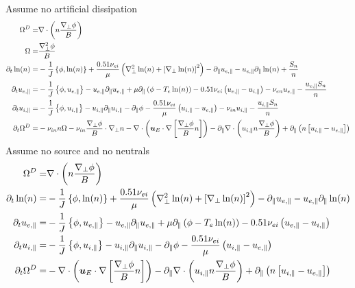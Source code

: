 Assume no artificial dissipation
\begin{align*}
\Om^D =& \div\L(n\frac{\grad_\perp\phi}{B}\R)
\\
%
%
%
\Om =& \frac{\grad_\perp^2\phi }{B}
\\
%
%
%
\partial_t \ln(n)
=&
 -\frac{1}{J}\L\{\phi,\ln(n)\R\}
 +\frac{0.51\nu_{ei}}{\mu}
 \L(
   \grad_\perp^2 \ln(n)
   + \L[\grad_\perp \ln(n)\R]^2
\R)
- \partial_\|u_{e,\|}
- u_{e,\|} \partial_\| \ln(n)
 + \frac{S_n}{n}
\\
%
%
%
\partial_t u_{e,\|}
 =&
 -\frac{1}{J}\L\{\phi,u_{e,\|}\R\}
 - u_{e,\|} \partial_\| u_{e,\|}
 + \mu \partial_\| \L(\phi - T_e  \ln(n)\R)
 - 0.51 \nu_{ei} \L(u_{e,\|}-u_{i,\|}\R)
 - \nu_{en} u_{e,\|}
 - \frac{u_{e,\|}S_{n}}{n}
\\
%
%
%
\partial_t u_{i,\|}
 =&
 -\frac{1}{J}\L\{\phi,u_{i,\|}\R\}
 - u_{i,\|} \partial_\| u_{i,\|}
 - \partial_\|\phi
 - \frac{ 0.51 \nu_{ei} }{ \mu } \L(u_{i,\|}-u_{e,\|}\R)
 - \nu_{in} u_{i,\|}
 - \frac{u_{i,\|}S_{n}}{n}
\\
%
%
%
  \partial_t \Om^D
  =&
  - \nu_{in} n\Om - \nu_{in} \frac{\grad_\perp \phi}{B} \cdot \grad_\perp n
  - \div \L( \ve{u}_E\cdot\nabla \L[\frac{\grad_\perp \phi}{B}n \R] \R)
  - \partial_\|\div \L( u_{i,\|}n \frac{\grad_\perp \phi}{B}\R)
 + \partial_\| \L(n\L[ u_{i,\|} - u_{e,\|} \R]\R)
\end{align*}
Assume no source and no neutrals
\begin{align*}
\Om^D =& \div\L(n\frac{\grad_\perp\phi}{B}\R)
\\
%
%
%
\partial_t \ln(n)
=&
 -\frac{1}{J}\L\{\phi,\ln(n)\R\}
 +\frac{0.51\nu_{ei}}{\mu}
 \L(
   \grad_\perp^2 \ln(n)
   + \L[\grad_\perp \ln(n)\R]^2
\R)
- \partial_\|u_{e,\|}
- u_{e,\|} \partial_\| \ln(n)
\\
%
%
%
\partial_t u_{e,\|}
 =&
 -\frac{1}{J}\L\{\phi,u_{e,\|}\R\}
 - u_{e,\|} \partial_\| u_{e,\|}
 + \mu \partial_\| \L(\phi - T_e  \ln(n)\R)
 - 0.51 \nu_{ei} \L(u_{e,\|}-u_{i,\|}\R)
\\
%
%
%
\partial_t u_{i,\|}
 =&
 -\frac{1}{J}\L\{\phi,u_{i,\|}\R\}
 - u_{i,\|} \partial_\| u_{i,\|}
 - \partial_\|\phi
 - \frac{ 0.51 \nu_{ei} }{ \mu } \L(u_{i,\|}-u_{e,\|}\R)
\\
%
%
%
  \partial_t \Om^D
  =&
  - \div \L( \ve{u}_E\cdot\nabla \L[\frac{\grad_\perp \phi}{B}n \R] \R)
  - \partial_\|\div \L( u_{i,\|}n \frac{\grad_\perp \phi}{B}\R)
 + \partial_\| \L(n\L[ u_{i,\|} - u_{e,\|} \R]\R)
\end{align*}
